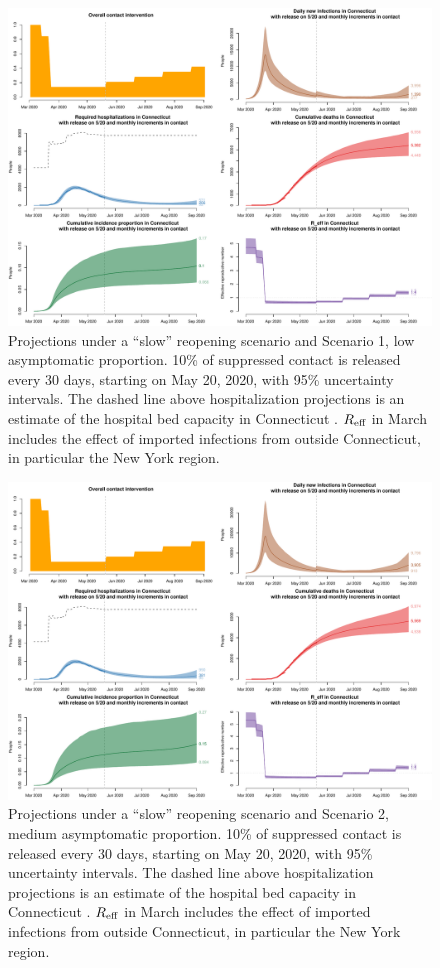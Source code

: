 \documentclass[11pt]{article}
\begin{document}
\begin{figure} %
	\centering
	\includegraphics[width=.9\textwidth]{figures/slow_low_full.pdf}
	\caption{Projections under a ``slow'' reopening scenario and Scenario 1, low asymptomatic proportion. 10\% of suppressed contact is released every 30 days, starting on May 20, 2020, with 95\% uncertainty intervals. The dashed line above hospitalization projections is an estimate of the hospital bed capacity in Connecticut \citep{CHAwebsite}. $R\textsubscript{eff}$ in March includes the effect of imported infections from outside Connecticut, in particular the New York region.}
	\label{fig:slow_low}
\end{figure}

\begin{figure} %
	\centering
	\includegraphics[width=.9\textwidth]{figures/slow_medium_full.pdf}
	\caption{Projections under a ``slow'' reopening scenario and Scenario 2, medium asymptomatic proportion. 10\% of suppressed contact is released every 30 days, starting on May 20, 2020, with 95\% uncertainty intervals. The dashed line above hospitalization projections is an estimate of the hospital bed capacity in Connecticut \citep{CHAwebsite}. $R\textsubscript{eff}$ in March includes the effect of imported infections from outside Connecticut, in particular the New York region.}
	\label{fig:slow_medium}
\end{figure}
\end{document}
